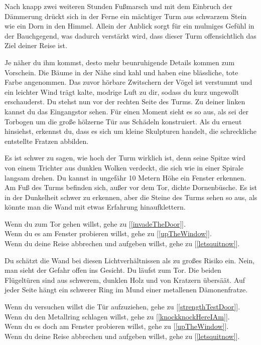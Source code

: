 
Nach knapp zwei weiteren Stunden Fußmarsch und mit dem Einbruch der Dämmerung drückt sich in der Ferne ein mächtiger Turm aus schwarzem Stein wie ein Dorn in den Himmel. Allein der Anblick sorgt für ein mulmiges Gefühl in der Bauchgegend, was dadurch verstärkt wird, dass dieser Turm offensichtlich das Ziel deiner Reise ist.

Je näher du ihm kommst, desto mehr beunruhigende Details kommen zum Vorschein. Die Bäume in der Nähe sind kahl und haben eine blässliche, tote Farbe angenommen. Das zuvor hörbare Zwitschern der Vögel ist verstummt und ein leichter Wind trägt kalte, modrige Luft zu dir, sodass du kurz ungewollt erschauderst. Du stehst nun vor der rechten Seite des Turms. Zu deiner linken kannst du das Eingangstor sehen. Für einen Moment sieht es so aus, als sei der Torbogen um die große hölzerne Tür aus Schädeln konstruiert. Als du erneut hinsiehst, erkennst du, dass es sich um kleine Skulpturen handelt, die schreckliche entstellte Fratzen abbilden.

Es ist schwer zu sagen, wie hoch der Turm wirklich ist, denn seine Spitze wird von einem Trichter aus dunklen Wolken verdeckt, die sich wie in einer Spirale langsam drehen. Du kannst in ungefähr 10 Metern Höhe ein Fenster erkennen. Am Fuß des Turms befinden sich, außer vor dem Tor, dichte Dornenbüsche. Es ist in der Dunkelheit schwer zu erkennen, aber die Steine des Turms sehen so aus, als könnte man die Wand mit etwas Erfahrung hinaufklettern.

Wenn du zum Tor gehen willst, gehe zu [\ref{invadeTheDoor}].
\\Wenn du es am Fenster probieren willst, gehe zu [\ref{upTheWindow}].
\\Wenn du deine Reise abbrechen und aufgeben willst, gehe zu [\ref{letsquitnow}].


Du schätzt die Wand bei diesen Lichtverhältnissen als zu großes Risiko ein. Nein, man sieht der Gefahr offen ins Gesicht. Du läufst zum Tor. Die beiden Flügeltüren sind aus schwerem, dunklen Holz und von Kratzern übersäät. Auf jeder Seite hängt ein schwerer Ring im Mund einer metallenen Dämonenfratze.

Wenn du versuchen willst die Tür aufzuziehen, gehe zu [\ref{strengthTestDoor}].
\\Wenn du den Metallring schlagen willst, gehe zu [\ref{knockknockHereIAm}].
\\Wenn du es doch am Fenster probieren willst, gehe zu [\ref{upTheWindow}].
\\Wenn du deine Reise abbrechen und aufgeben willst, gehe zu [\ref{letsquitnow}].


